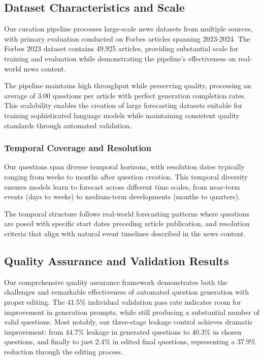 \subsection{Dataset Characteristics and Scale}
\label{subsec:dataset_characteristics}

Our curation pipeline processes large-scale news datasets from multiple sources, with primary evaluation conducted on Forbes articles spanning 2023-2024. The Forbes 2023 dataset contains 49,925 articles, providing substantial scale for training and evaluation while demonstrating the pipeline's effectiveness on real-world news content.

The pipeline maintains high throughput while preserving quality, processing an average of 3.00 questions per article with perfect generation completion rates. This scalability enables the creation of large forecasting datasets suitable for training sophisticated language models while maintaining consistent quality standards through automated validation.

\subsubsection{Temporal Coverage and Resolution}
Our questions span diverse temporal horizons, with resolution dates typically ranging from weeks to months after question creation. This temporal diversity ensures models learn to forecast across different time scales, from near-term events (days to weeks) to medium-term developments (months to quarters).

The temporal structure follows real-world forecasting patterns where questions are posed with specific start dates preceding article publication, and resolution criteria that align with natural event timelines described in the news content.

\subsection{Quality Assurance and Validation Results}
\label{subsec:quality_assurance}

Our comprehensive quality assurance framework demonstrates both the challenges and remarkable effectiveness of automated question generation with proper editing. The 41.5\% individual validation pass rate indicates room for improvement in generation prompts, while still producing a substantial number of valid questions. Most notably, our three-stage leakage control achieves dramatic improvement: from 44.7\% leakage in generated questions to 40.3\% in chosen questions, and finally to just 2.4\% in edited final questions, representing a 37.9\% reduction through the editing process.

